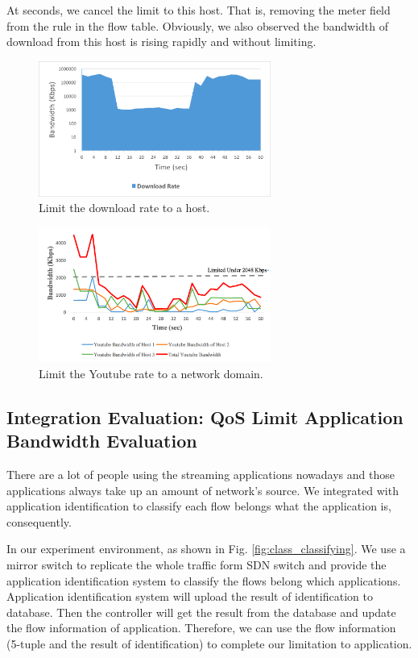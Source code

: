 \documentclass[journal]{IEEEtran}
\begin{document}
At  seconds, we cancel the limit to this host. That is, removing the meter field from the rule in the flow table. Obviously, we also observed the bandwidth of download from this host is rising rapidly and without limiting.

\begin{figure}[!t]
\centering
\includegraphics[width=3in]{./figures/qos_limit_host}
\caption{Limit the download rate to a host.}
\label{fig:qos_limit_host}
\end{figure}

\begin{figure}[!t]
\centering
\includegraphics[width=3in]{./figures/mft_qos_rate_domain_app}
\caption{Limit the Youtube rate to a network domain.}
\label{fig:mft_qos_rate_domain_app}
\end{figure}

\subsection{Integration Evaluation: QoS Limit Application Bandwidth Evaluation}

There are a lot of people using the streaming applications nowadays and those applications always take up an amount of network’s source. We integrated with application identification to classify each flow belongs what the application is, consequently.

In our experiment environment, as shown in Fig. \ref{fig:class_classifying}. We use a mirror switch to replicate the whole traffic form SDN switch and provide the application identification system to classify the flows belong which applications. Application identification system will upload the result of identification to database. Then the controller will get the result from the database and update the flow information of application. Therefore, we can use the flow information (5-tuple and the result of identification) to complete our limitation to application.
\end{document}
